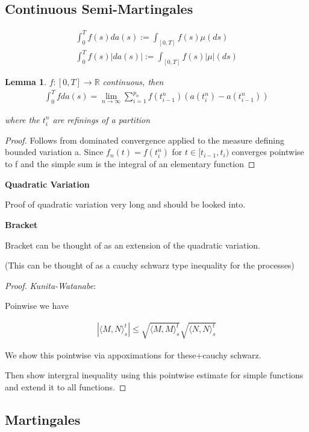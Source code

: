 \documentclass[11pt]{article}
\newcommand{\R}{\mathbb{R}}
\newtheorem{lemma}{Lemma}
\begin{document}
\subsection{Continuous Semi-Martingales}

\begin{align*}
	\int_0^T f(s) da(s) := \int_{[0,T]} f(s) \mu(ds)\\
	\int_0^T f(s) |da(s)| := \int_{[0,T]} f(s) |\mu|(ds)
\end{align*}

\begin{lemma}
$f : [0,T] \to \R$ continuous, then
\begin{align*}
	\int_0^T f da(s) = \lim_{n \to \infty}\sum_{i=1}^{p_n} f(t_{i-1}^n)(a(t_i^n) - a(t_{i-1}^n))
\end{align*}

where the $t_i^n$ are refinings of a partition
\end{lemma}

\begin{proof}
	Follows from dominated convergence applied to the measure defining bounded variation a. Since $f_n(t) = f(t_{i}^n)$ for $t \in [t_{i-1},t_i)$ converges pointwise to f and the simple sum is the integral of an elementary function
	\end{proof}

\textbf{Quadratic Variation}

Proof of quadratic variation very long and should be looked into.

\textbf{Bracket}

Bracket can be thought of as an extension of the quadratic variation.

(This can be thought of as a cauchy schwarz type inequality for the processes)
\begin{proof}
\textit{Kunita-Watanabe}:

Poinwise we have 

\begin{align*}
	|\langle M, N \rangle_s^t| \leq \sqrt{\langle M,M \rangle_s^t}\sqrt{\langle N,N \rangle_s^t}
\end{align*}

We show this pointwise via appoximations for these+cauchy schwarz.

Then show intergral inequality using this pointwise estimate for simple functions and extend it to all functions.

\end{proof}

\subsection{Martingales}
\end{document}
